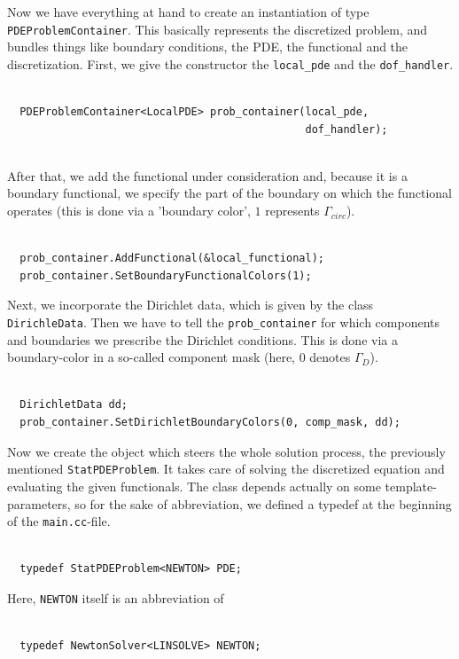\documentclass[smallextended]{svjour3}       %
\numberwithin{equation}{section}
\begin{document}
Now we have everything at hand to create an instantiation of type \texttt{PDEProblemContainer}. This basically represents the discretized problem, and bundles things like boundary conditions, the PDE, the functional and the discretization. First, we give the constructor the \texttt{local\_pde} and the \texttt{dof\_handler}.
\begin{lstlisting}

  PDEProblemContainer<LocalPDE> prob_container(local_pde,
                                               dof_handler);
                                               
\end{lstlisting}
After that, we add the functional under consideration and, because it is a boundary functional, we specify the part of the boundary on which the functional operates (this is done via a 'boundary color', $1$ represents $\Gamma_{circ}$).
\begin{lstlisting}

  prob_container.AddFunctional(&local_functional);
  prob_container.SetBoundaryFunctionalColors(1);

\end{lstlisting}
Next, we incorporate the Dirichlet data, which is given by the class
\texttt{DirichleData}. Then we have to tell the \texttt{prob\_container} for
which components and boundaries we prescribe the Dirichlet conditions. This is
done via a boundary-color in a so-called component mask 
(here, $0$ denotes $\Gamma_D$).
\begin{lstlisting}

  DirichletData dd;
  prob_container.SetDirichletBoundaryColors(0, comp_mask, dd);

\end{lstlisting}
Now we create the object which steers the whole solution process, the previously mentioned \texttt{StatPDEProblem}. It takes care of solving the discretized equation and evaluating the given functionals. The class depends actually on some template-parameters, so for the sake of abbreviation, we defined a typedef at the beginning of the \texttt{main.cc}-file.
\begin{lstlisting}

  typedef StatPDEProblem<NEWTON> PDE;

\end{lstlisting}
Here, \texttt{NEWTON} itself is an abbreviation of
\begin{lstlisting}
  
  typedef NewtonSolver<LINSOLVE> NEWTON;

\end{lstlisting}
\end{document}
